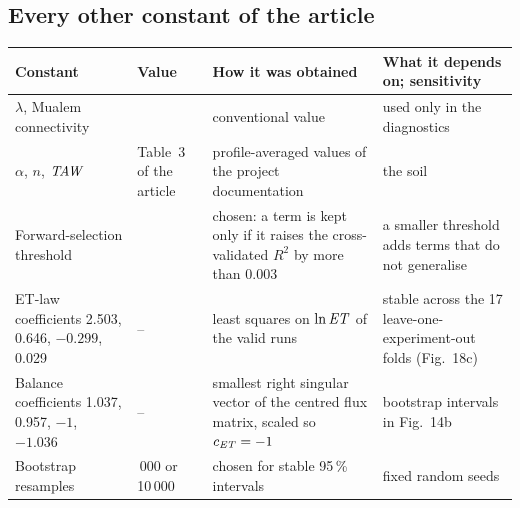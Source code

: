 \subsection{Every other constant of the article}
{\small\begin{longtable}{>{\raggedright\arraybackslash}p{}>{\raggedright\arraybackslash}p{}>{\raggedright\arraybackslash}p{}>{\raggedright\arraybackslash}p{}}
\toprule Constant & Value & How it was obtained & What it depends on; sensitivity\\\midrule\endhead
$\lambda$, Mualem connectivity & 0.5 & conventional value \citep{Mualem1976} & used only in the diagnostics\\
$\alpha$, $n$, $\mathit{TAW}$ & Table~3 of the article & profile-averaged values of the project documentation & the soil\\
Forward-selection threshold & 0.003 & chosen: a term is kept only if it raises the cross-validated $R^2$ by more than 0.003 & a smaller threshold adds terms that do not generalise\\
ET-law coefficients 2.503, 0.646, $-0.299$, 0.029 & -- & least squares on $\ln\mathit{ET}$ of the valid runs & stable across the 17 leave-one-experiment-out folds (Fig.~18c)\\
Balance coefficients 1.037, 0.957, $-1$, $-1.036$ & -- & smallest right singular vector of the centred flux matrix, scaled so $c_{\mathit{ET}}=-1$ & bootstrap intervals in Fig.~14b\\
Bootstrap resamples & 5\,000 or 10\,000 & chosen for stable 95\,\% intervals & fixed random seeds\\\bottomrule
\end{longtable}}
